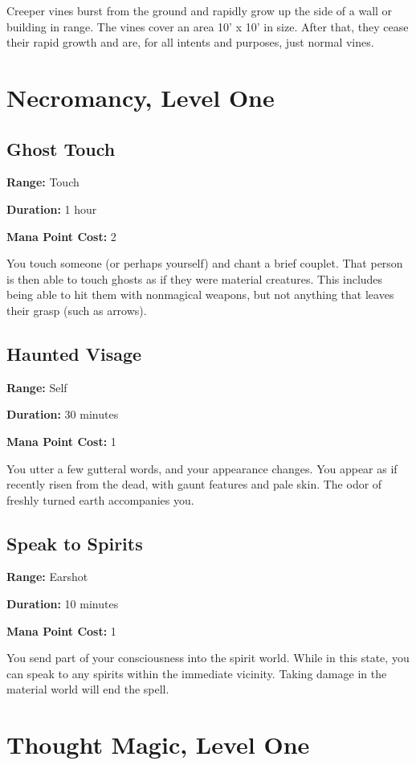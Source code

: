 \begin{multicols}{2}
Creeper vines burst from the ground and rapidly grow up the side of
a wall or building in range. The vines cover an area 10' x 10' in
size. After that, they cease their rapid growth and are, for all
intents and purposes, just normal vines.

\section{Necromancy, Level One}

\subsection{Ghost Touch}

\textbf{Range:} Touch

\textbf{Duration:} 1 hour

\textbf{Mana Point Cost:} 2

You touch someone (or perhaps yourself) and chant a brief couplet.
That person is then able to touch ghosts as if they were material
creatures. This includes being able to hit them with nonmagical
weapons, but not anything that leaves their grasp (such as arrows).

\subsection{Haunted Visage}

\textbf{Range:} Self

\textbf{Duration:} 30 minutes

\textbf{Mana Point Cost:} 1

You utter a few gutteral words, and your appearance changes. You
appear as if recently risen from the dead, with gaunt features and
pale skin. The odor of freshly turned earth accompanies you.

\subsection{Speak to Spirits}

\textbf{Range:} Earshot

\textbf{Duration:} 10 minutes

\textbf{Mana Point Cost:} 1

You send part of your consciousness into the spirit world.
While in this state, you can speak to any spirits within the immediate
vicinity. Taking damage in the material world will end the spell.

\section{Thought Magic, Level One}


\end{multicols}

